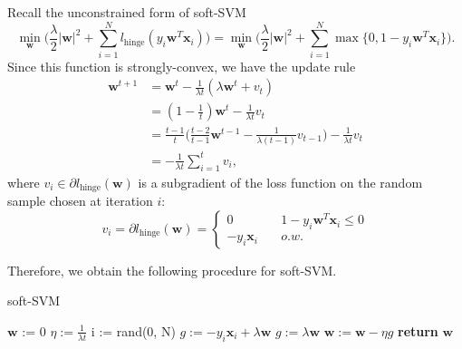 \documentclass[../main.tex]{subfiles}
\begin{document}
\setlength{\parindent}{0pt}
Recall the unconstrained form of soft-SVM $$\min_{\textbf{w}}\big( \frac{\lambda}{2}|\textbf{w}|^2+\sum_{i=1}^Nl_{\text{hinge}}(y_i\textbf{w}^T\textbf{x}_i) \big)=\min_{\textbf{w}}\big( \frac{\lambda}{2}|\textbf{w}|^2+\sum_{i=1}^N\max\{ 0, 1-y_i\textbf{w}^T\textbf{x}_i \} \big).$$
Since this function is strongly-convex, we have the update rule
\begin{equation} \label{eq3-5}
\begin{split}
\textbf{w}^{t+1} & = \textbf{w}^t-\frac{1}{\lambda t}(\lambda\textbf{w}^t+v_t) \\
 & = (1-\frac{1}{t})\textbf{w}^t-\frac{1}{\lambda t}v_t \\
 & = \frac{t-1}{t}\big( \frac{t-2}{t-1}\textbf{w}^{t-1}-\frac{1}{\lambda(t-1)}v_{t-1} \big)-\frac{1}{\lambda t}v_t \\
 & = -\frac{1}{\lambda t}\sum_{i=1}^t v_i,
\end{split}
\end{equation}
where $v_i\in \partial l_{\text{hinge}}(\textbf{w})$ is a subgradient of the loss function on the random sample chosen at iteration $i$:
\begin{equation} \label{eq3-6}
v_i = \partial l_{\text{hinge}}(\textbf{w}) = \left\{
        \begin{array}{ll}
            0 & \quad 1-y_i\textbf{w}^T\textbf{x}_i \leq 0\\
            -y_i\textbf{x}_i & \quad o.w.
        \end{array}
    \right.
\end{equation}

Therefore, we obtain the following procedure for soft-SVM.
\smallskip\begin{algorithm}[H]
\caption{soft-SVM}\label{soft-svm}
\begin{algorithmic}[5]
  \State $\textbf{w}$ := 0
    \State $\eta:=\frac{1}{\lambda t}$
    \State i := rand(0, N)
      \State $g:=-y_i\textbf{x}_i+\lambda\textbf{w}$
    \Else
      \State $g:=\lambda\textbf{w}$
    \EndIf
    \State $\textbf{w}:=\textbf{w}-\eta g$
  \EndFor
  \State \textbf{return} $\textbf{w}$
\EndProcedure
\end{algorithmic}
\end{algorithm}\smallskip
\end{document}
